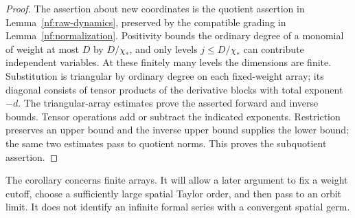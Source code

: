 \begin{proof}
The assertion about new coordinates is the quotient assertion in
Lemma~\ref{nf:raw-dynamics}, preserved by the compatible grading in
Lemma~\ref{nf:normalization}.  Positivity bounds the ordinary degree
of a monomial of weight at most $D$ by $D/\chi_*$, and only levels
$j\leq D/\chi_*$ can contribute independent variables.  At these
finitely many levels the dimensions are finite.  Substitution is
triangular by ordinary degree on each fixed-weight array; its
diagonal consists of tensor products of the derivative blocks
with total exponent $-d$.  The triangular-array estimates prove
the asserted forward and inverse bounds.  Tensor operations add
or subtract the indicated exponents.  Restriction preserves an
upper bound and the inverse upper bound supplies the lower bound;
the same two estimates pass to quotient norms.  This proves the
subquotient assertion.
\end{proof}

The corollary concerns finite arrays.  It will allow a later argument
to fix a weight cutoff, choose a sufficiently large spatial Taylor
order, and then pass to an orbit limit.  It does not identify an
infinite formal series with a convergent spatial germ.
